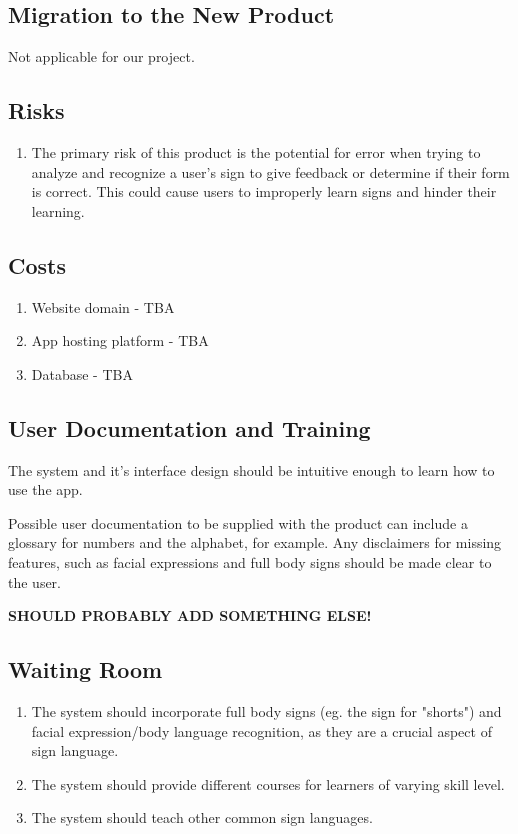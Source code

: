 \documentclass[12pt, titlepage]{article}
\begin{document}
\subsection{Migration to the New Product}
Not applicable for our project.

\subsection{Risks}

\begin{enumerate}
    \item The primary risk of this product is the potential for error when trying to analyze and recognize a user's sign to give feedback or determine if their form is correct. This could cause users to improperly learn signs and hinder their learning.
\end{enumerate}

\subsection{Costs}
\begin{enumerate}
    \item Website domain - TBA
    \item App hosting platform - TBA
    \item Database - TBA
\end{enumerate}

\subsection{User Documentation and Training}
The system and it's interface design should be intuitive enough to learn how to use the app.

Possible user documentation to be supplied with the product can include a glossary for numbers and the alphabet, for example. Any disclaimers for missing features, such as facial expressions and full body signs should be made clear to the user.

\bf{SHOULD PROBABLY ADD SOMETHING ELSE!}

\subsection{Waiting Room}
\begin{enumerate}
    \item The system should incorporate full body signs (eg. the sign for "shorts") and facial expression/body language recognition, as they are a crucial aspect of sign language.
    \item The system should provide different courses for learners of varying skill level.
    \item The system should teach other common sign languages.
\end{enumerate}
\end{document}
